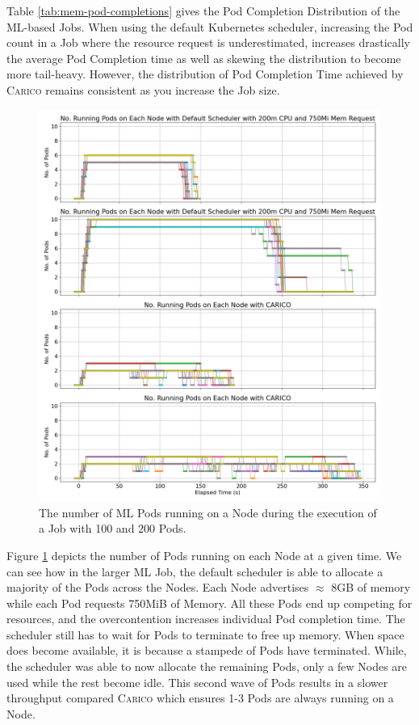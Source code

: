 Table \ref{tab:mem-pod-completions} gives the Pod Completion Distribution of the
ML-based Jobs. When using the default Kubernetes scheduler, increasing the Pod
count in a Job where the resource request is underestimated, increases
drastically the average Pod Completion time as well as skewing the distribution
to become more tail-heavy. However, the distribution of Pod Completion Time
achieved by \textsc{Carico} remains consistent as you increase the Job size.

\begin{figure}[ht!]
    \centering
    \includegraphics[width=\textwidth]{images/ml-running-pods.png}
    \caption{The number of ML Pods running on a Node during the
    execution of a Job with 100 and 200 Pods.}
    \label{fig:ml-pod-running}
\end{figure}
Figure \ref{fig:ml-pod-running} depicts the number of Pods running on each Node
at a given time. We can see how in the larger ML Job, the default scheduler is
able to allocate a majority of the Pods across the Nodes. Each Node advertises
$\approx$ 8GB of memory while each Pod requests 750MiB of Memory. All these Pods
end up competing for resources, and the overcontention increases individual
Pod completion time. The scheduler still has to wait for Pods to terminate to
free up memory. When space does become available, it is because a
stampede of Pods have terminated. While, the scheduler was able to now allocate
the remaining Pods, only a few Nodes are used while the rest become idle. This
second wave of Pods results in a slower throughput compared \textsc{Carico} which ensures
1-3 Pods are always running on a Node.

